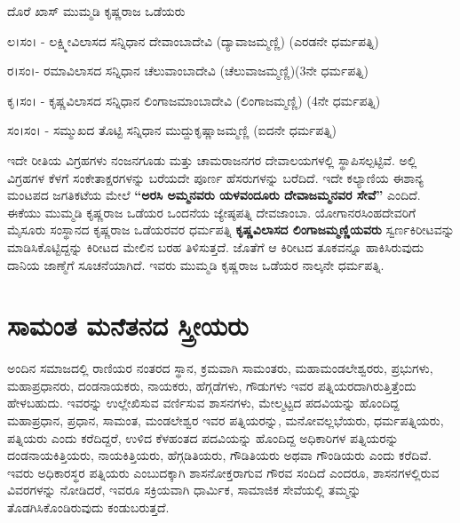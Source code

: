 ದೊರೆ  ಖಾಸ್​  ಮುಮ್ಮಡಿ ಕೃಷ್ಣರಾಜ ಒಡೆಯರು

ಲ।ಸಂ। - ಲಕ್ಷ್ಮೀವಿಲಾಸದ ಸನ್ನಿಧಾನ ದೇವಾಂಬಾದೇವಿ (ದ್ಯಾವಾಜಮ್ಮಣ್ಣಿ) (ಎರಡನೇ ಧರ್ಮಪತ್ನಿ)

ರ।ಸಂ।- ರಮಾವಿಲಾಸದ ಸನ್ನಿಧಾನ ಚೆಲುವಾಂಬಾದೇವಿ (ಚೆಲುವಾಜಮ್ಮಣ್ಣಿ)(3ನೇ ಧರ್ಮಪತ್ನಿ)

ಕೃ।ಸಂ। - ಕೃಷ್ಣವಿಲಾಸದ ಸನ್ನಿಧಾನ ಲಿಂಗಾಜಮಾಂಬಾದೇವಿ (ಲಿಂಗಾಜಮ್ಮಣ್ಣಿ) (4ನೇ ಧರ್ಮಪತ್ನಿ)

ಸಂ।ಸಂ। - ಸಮ್ಮುಖದ ತೊಟ್ಟಿ ಸನ್ನಿಧಾನ ಮುದ್ದುಕೃಷ್ಣಾಜಮ್ಮಣ್ಣಿ (ಐದನೇ ಧರ್ಮಪತ್ನಿ)

ಇದೇ ರೀತಿಯ ವಿಗ್ರಹಗಳು ನಂಜನಗೂಡು ಮತ್ತು ಚಾಮರಾಜನಗರ ದೇವಾಲಯಗಳಲ್ಲಿ ಸ್ಥಾಪಿಸಲ್ಪಟ್ಟಿವೆ. ಅಲ್ಲಿ ವಿಗ್ರಹಗಳ ಕೆಳಗೆ ಸಂಕೇತಾಕ್ಷರಗಳನ್ನು ಬರೆಯದೇ ಪೂರ್ಣ ಹೆಸರುಗಳನ್ನು ಬರೆದಿದೆ. ಇದೇ ಕಲ್ಯಾಣಿಯ ಈಶಾನ್ಯ ಮಂಟಪದ ಜಗತಿಕಟೆಯ ಮೇಲೆ \textbf{“ಅರಸಿ ಅಮ್ಮನವರು ಯಳವಂದೂರು ದೇವಾಜಮ್ಮನವರ ಸೇವೆ”} ಎಂದಿದೆ. ಈಕೆಯು ಮುಮ್ಮಡಿ ಕೃಷ್ಣರಾಜ ಒಡೆಯರ ಒಂದನೆಯ ಜ್ಯೇಷ್ಠಪತ್ನಿ ದೇವಜಾಂಬಾ. ಯೋಗಾನರಸಿಂಹದೇವರಿಗೆ ಮೈಸೂರು ಸಂಸ್ಥಾನದ ಕೃಷ್ಣರಾಜ ಒಡೆಯರವರ ಧರ್ಮಪತ್ನಿ \textbf{ಕೃಷ್ಣವಿಲಾಸದ ಲಿಂಗಾಜಮ್ಮಣ್ಣಿಯವರು} ಸ್ವರ್ಣಕಿರೀಟವನ್ನು ಮಾಡಿಸಿಕೊಟ್ಟಿದ್ದನ್ನು ಕಿರೀಟದ ಮೇಲಿನ ಬರಹ ತಿಳಿಸುತ್ತದೆ. ಜೊತೆಗೆ ಆ ಕಿರೀಟದ ತೂಕವನ್ನೂ ಹಾಕಿಸಿರುವುದು ದಾನಿಯ ಜಾಣ್ಮೆಗೆ ಸೂಚನೆಯಾಗಿದೆ. ಇವರು ಮುಮ್ಮಡಿ ಕೃಷ್ಣರಾಜ ಒಡೆಯರ ನಾಲ್ಕನೇ ಧರ್ಮಪತ್ನಿ.


\section{ಸಾಮಂತ ಮನೆತನದ ಸ್ತ್ರೀಯರು}

ಅಂದಿನ ಸಮಾಜದಲ್ಲಿ ರಾಣಿಯರ ನಂತರದ ಸ್ಥಾನ, ಕ್ರಮವಾಗಿ ಸಾಮಂತರು, ಮಹಾಮಂಡಲೇಶ್ವರರು, ಪ್ರಭುಗಳು, ಮಹಾಪ್ರಧಾನರು, ದಂಡನಾಯಕರು, ನಾಯಕರು, ಹೆಗ್ಗಡೆಗಳು, ಗೌಡುಗಳು ಇವರ ಪತ್ನಿಯರದಾಗಿರುತ್ತಿತ್ತೆಂದು ಹೇಳಬಹುದು. ಇವರನ್ನು ಉಲ್ಲೇಖಿಸುವ ವರ್ಣಿಸುವ ಶಾಸನಗಳು, ಮೇಲ್ಮಟ್ಟದ ಪದವಿಯನ್ನು ಹೊಂದಿದ್ದ ಮಹಾಪ್ರಧಾನ, ಪ್ರಧಾನ, ಸಾಮಂತ, ಮಂಡಲೇಶ್ವರ ಇವರ ಪತ್ನಿಯರನ್ನು, ಮನೋವಲ್ಲಭೆಯರು, ಧರ್ಮಪತ್ನಿಯರು, ಪತ್ನಿಯರು ಎಂದು ಕರೆದಿದ್ದರೆ, ಉಳಿದ ಕೆಳಹಂತದ ಪದವಿಯನ್ನು ಹೊಂದಿದ್ದ ಅಧಿಕಾರಿಗಳ ಪತ್ನಿಯರನ್ನು ದಂಡನಾಯಕಿತ್ತಿಯರು, ನಾಯಕಿತ್ತಿಯರು, ಹೆಗ್ಗಡಿತಿಯರು, ಗೌಡಿತಿಯರು ಅಥವಾ ಗೌಂಡಿಯರು ಎಂದು ಕರೆದಿವೆ. ಇವರು ಅಧಿಕಾರಸ್ಥರ ಪತ್ನಿಯರು ಎಂಬುದಕ್ಕಾಗಿ ಶಾಸನೋಕ್ತರಾಗುವ ಗೌರವ ಸಂದಿದೆ ಎಂದರೂ, ಶಾಸನಗಳಲ್ಲಿರುವ ವಿವರಗಳನ್ನು ನೋಡಿದರೆ, ಇವರೂ ಸಕ್ರಿಯವಾಗಿ ಧಾರ್ಮಿಕ, ಸಾಮಾಜಿಕ ಸೇವೆಯಲ್ಲಿ ತಮ್ಮನ್ನು ತೊಡಗಿಸಿಕೊಂಡಿರುವುದು ಕಂಡುಬರುತ್ತದೆ.

